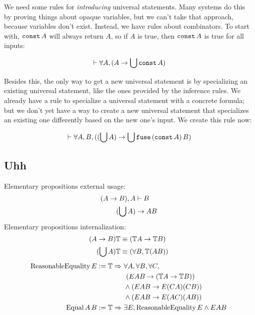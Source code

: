 \documentclass{article}
\begin{document}
  We need some rules for \emph{introducing} universal statements. Many systems do this by proving things about opaque variables, but we can't take that approach, because variables don't exist. Instead, we have rules about combinators. To start with, $\operatorname{\texttt{const}} A$ will always return $A$, so if $A$ is true, then $\operatorname{\texttt{const}} A$ is true for all inputs:
  
  \begin{align*}
    &\vdash \forall A, (A \to \bigcup \operatorname{\texttt{const}} A)\\
  \end{align*}
  
  Besides this, the only way to get a new universal statement is by specializing an existing universal statement, like the ones provided by the inference rules. We already have a rule to specialize a universal statement with a concrete formula; but we don't yet have a way to create a new universal statement that specializes an existing one differently based on the new one's input. We create this rule now:
  
  \begin{align*}
    &\vdash \forall A, B, ((\bigcup A) \to \bigcup \operatorname{\texttt{fuse}}\,(\operatorname{\texttt{const}} A)\,B)\\
  \end{align*}
  
    
  \subsection{Uhh}
  Elementary propositions external usage:
  \begin{align*}
    (A \to B), A &\vdash B\\
    (\bigcup A) &\to AB\\
  \end{align*}
  Elementary propositions internalization:
  \begin{align*}
    (A \to B)\mathbb{T} &\equiv (\mathbb{T}A \to \mathbb{T}B)\\
    (\bigcup A)\mathbb{T} &\equiv (\forall B, \mathbb{T}(AB))\\
  \end{align*}
  \begin{align*}
    \mathrm{ReasonableEquality}\,E := \nameabst{\mathbb{T}}\ &\forall A, \forall B, \forall C,\\
      &\ (EAB \to (\mathbb{T}A \to \mathbb{T}B))\\
      &\wedge (EAB \to E(CA)(CB))\\
      &\wedge (EAB \to E(AC)(AB))\\
    \mathrm{Equal}\,A\,B := \nameabst{\mathbb{T}}\ &\exists E, \mathrm{ReasonableEquality}\,E \wedge EAB
  \end{align*}
  
\end{document}
